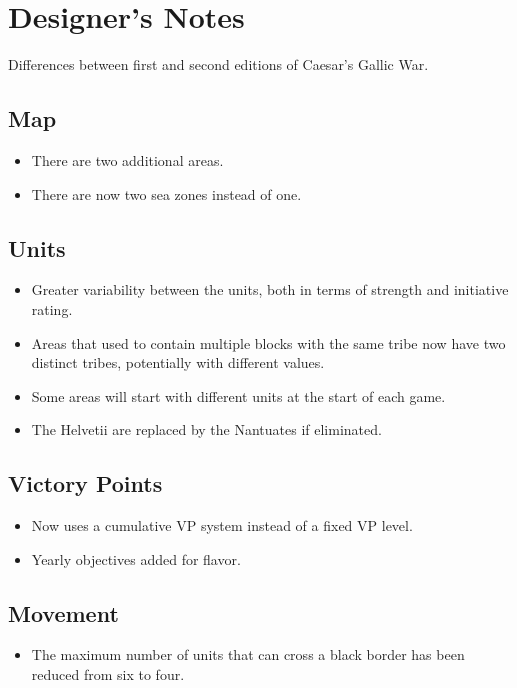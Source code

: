 \clearpage
\section{Designer's Notes}
Differences between first and second editions of Caesar's Gallic War.

\subsection{Map}
\begin{itemize}
	\item There are two additional areas.
	\item There are now two sea zones instead of one.
\end{itemize}

\subsection{Units}
\begin{itemize}
	\item Greater variability between the units, both in terms of strength and initiative rating.
  	\item Areas that used to contain multiple blocks with the same tribe now have two distinct tribes, potentially with different values.
  	\item Some areas will start with different units at the start of each game.
 	\item The Helvetii are replaced by the Nantuates if eliminated. 
\end{itemize}
  
\subsection{Victory Points}
\begin{itemize}
	\item Now uses a cumulative VP system instead of a fixed VP level.
  	\item Yearly objectives added for flavor.
\end{itemize}
  
\subsection{Movement}
\begin{itemize}
  	\item The maximum number of units that can cross a black border has been reduced from six to four.
\end{itemize}
  
